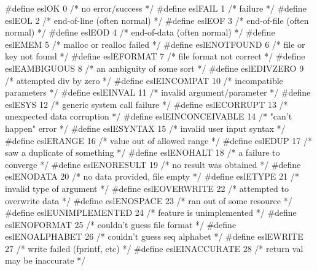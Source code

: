 \begin{cchunk}
#define eslOK              0    /* no error/success             */
#define eslFAIL            1    /* failure                      */
#define eslEOL             2    /* end-of-line (often normal)   */
#define eslEOF             3    /* end-of-file (often normal)   */
#define eslEOD             4    /* end-of-data (often normal)   */
#define eslEMEM            5    /* malloc or realloc failed     */
#define eslENOTFOUND       6    /* file or key not found        */
#define eslEFORMAT         7    /* file format not correct      */
#define eslEAMBIGUOUS      8    /* an ambiguity of some sort    */
#define eslEDIVZERO        9    /* attempted div by zero        */
#define eslEINCOMPAT      10    /* incompatible parameters      */
#define eslEINVAL         11    /* invalid argument/parameter   */
#define eslESYS           12    /* generic system call failure  */
#define eslECORRUPT       13    /* unexpected data corruption   */
#define eslEINCONCEIVABLE 14    /* "can't happen" error         */
#define eslESYNTAX        15    /* invalid user input syntax    */
#define eslERANGE         16    /* value out of allowed range   */
#define eslEDUP           17    /* saw a duplicate of something */
#define eslENOHALT        18    /* a failure to converge        */      
#define eslENORESULT      19    /* no result was obtained       */
#define eslENODATA        20    /* no data provided, file empty */
#define eslETYPE          21    /* invalid type of argument     */
#define eslEOVERWRITE     22    /* attempted to overwrite data  */
#define eslENOSPACE       23    /* ran out of some resource     */
#define eslEUNIMPLEMENTED 24    /* feature is unimplemented     */
#define eslENOFORMAT      25	/* couldn't guess file format   */
#define eslENOALPHABET    26	/* couldn't guess seq alphabet  */
#define eslEWRITE         27   	/* write failed (fprintf, etc)  */
#define eslEINACCURATE    28    /* return val may be inaccurate */
\end{cchunk}

